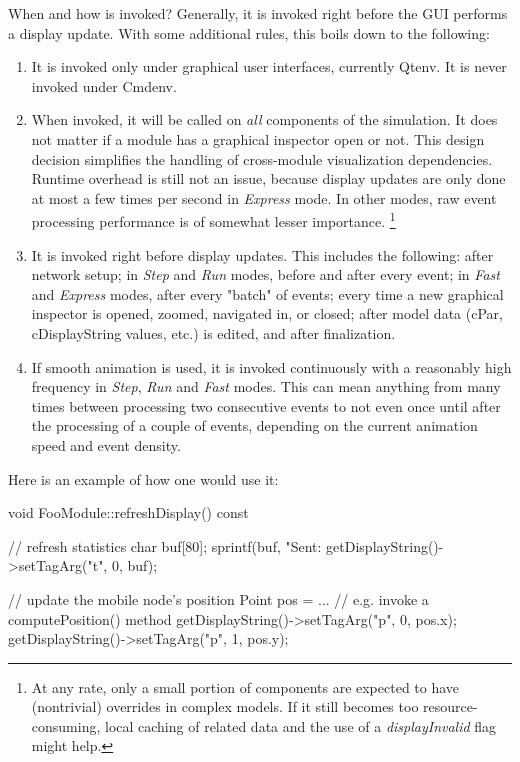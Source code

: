 When and how is  invoked? Generally, it is invoked right
before the GUI performs a display update. With some additional rules, this boils
down to the following:

\begin{enumerate}
\item It is invoked only under graphical user interfaces, currently Qtenv.
     It is never invoked under Cmdenv.

\item When invoked, it will be called on \textit{all} components of the
      simulation. It does not matter if a module has a graphical inspector
      open or not. This design decision simplifies the handling
      of cross-module visualization dependencies. Runtime overhead is
      still not an issue, because display updates are only done at most
      a few times per second in \textit{Express} mode. In other modes,
      raw event processing performance is of somewhat lesser importance.
      \footnote{At any rate, only a small portion of components are expected to
      have (nontrivial)  overrides in complex models.
      If it still becomes too resource-consuming, local caching of related
      data and the use of a \textit{displayInvalid} flag might help.}

\item It is invoked right before display updates. This includes the following:
      after network setup; in \textit{Step} and \textit{Run} modes, before and
      after every event; in \textit{Fast} and \textit{Express} modes, after
      every "batch" of events; every time a new graphical inspector is opened,
      zoomed, navigated in, or closed; after model data (cPar, cDisplayString
      values, etc.) is edited, and after finalization.

\item If smooth animation is used, it is invoked continuously with a reasonably
      high frequency in \textit{Step}, \textit{Run} and \textit{Fast} modes.
      This can mean anything from many times between processing two consecutive
      events to not even once until after the processing of a couple of events,
      depending on the current animation speed and event density.

\end{enumerate}

Here is an example of how one would use it:

\begin{cpp}
void FooModule::refreshDisplay() const
{
    // refresh statistics
    char buf[80];
    sprintf(buf, "Sent:%
    getDisplayString()->setTagArg("t", 0, buf);

    // update the mobile node's position
    Point pos = ...  // e.g. invoke a computePosition() method
    getDisplayString()->setTagArg("p", 0, pos.x);
    getDisplayString()->setTagArg("p", 1, pos.y);
}
\end{cpp}

